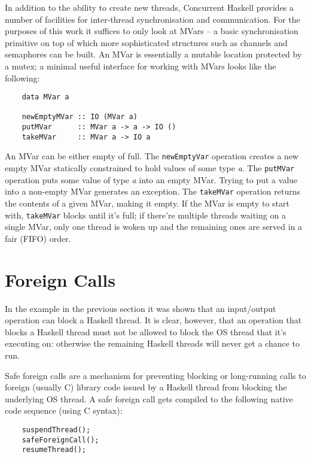 \documentclass[a4paper,11pt,oneside]{report}
\begin{document}
In addition to the ability to create new threads, Concurrent Haskell provides a
number of facilities for inter-thread synchronisation and communication. For the
purposes of this work it suffices to only look at MVars -- a basic
synchronisation primitive on top of which more sophisticated structures such as
channels and semaphores can be built. An MVar is essentially a mutable location
protected by a mutex; a minimal useful interface for working with MVars looks
like the following:

\begin{verbatim}
    data MVar a

    newEmptyMVar :: IO (MVar a)
    putMVar      :: MVar a -> a -> IO ()
    takeMVar     :: MVar a -> IO a
\end{verbatim}

An MVar can be either empty of full. The \texttt{newEmptyVar} operation creates
a new empty MVar statically constrained to hold values of some type
\textit{a}. The \texttt{putMVar} operation puts some value of type \textit{a}
into an empty MVar. Trying to put a value into a non-empty MVar generates an
exception. The \texttt{takeMVar} operation returns the contents of a given MVar,
making it empty. If the MVar is empty to start with, \texttt{takeMVar} blocks
until it's full; if there're multiple threads waiting on a single MVar, only one
thread is woken up and the remaining ones are served in a fair (FIFO) order.

\section{Foreign Calls}
\label{sec:foreign-calls}

In the example in the previous section it was shown that an input/output
operation can block a Haskell thread. It is clear, however, that an operation
that blocks a Haskell thread must not be allowed to block the OS thread that
it's executing on: otherwise the remaining Haskell threads will never get a
chance to run.

Safe foreign calls are a mechanism for preventing blocking or long-running calls
to foreign (usually C) library code issued by a Haskell thread from blocking the
underlying OS thread. A safe foreign call gets compiled to the following native
code sequence (using C syntax):

\begin{verbatim}
    suspendThread();
    safeForeignCall();
    resumeThread();
\end{verbatim}
\end{document}
